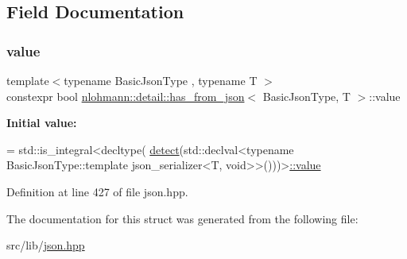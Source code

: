 \subsection{Field Documentation}
\mbox{\label{structnlohmann_1_1detail_1_1has__from__json_a16701d806343c58ae7e884024dd14955}} 
\subsubsection{\texorpdfstring{value}{value}}
{\footnotesize\ttfamily template$<$typename Basic\+Json\+Type , typename T $>$ \\
constexpr bool \hyperlink{structnlohmann_1_1detail_1_1has__from__json}{nlohmann\+::detail\+::has\+\_\+from\+\_\+json}$<$ Basic\+Json\+Type, T $>$\+::value\hspace{0.3cm}{\ttfamily [static]}}

{\bfseries Initial value\+:}
\begin{DoxyCode}
= std::is\_integral<decltype(
                                      \hyperlink{structnlohmann_1_1detail_1_1has__from__json_a94e93c638429df773f948f5243fd304b}{detect}(std::declval<\textcolor{keyword}{typename} BasicJsonType::template 
      json\_serializer<T, void>>()))>\hyperlink{structnlohmann_1_1detail_1_1has__from__json_a16701d806343c58ae7e884024dd14955}{::value}
\end{DoxyCode}


Definition at line 427 of file json.\+hpp.



The documentation for this struct was generated from the following file\+:\begin{DoxyCompactItemize}
\item 
src/lib/\hyperlink{json_8hpp}{json.\+hpp}\end{DoxyCompactItemize}

